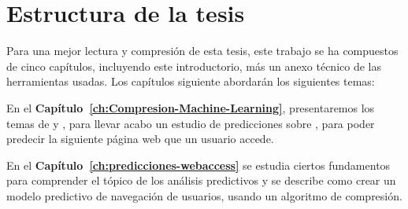 %
%
\section{Estructura de la tesis} 




Para una mejor lectura y compresión de esta tesis, este trabajo se ha compuestos de cinco capítulos, incluyendo este introductorio, más un anexo técnico de las herramientas usadas. Los capítulos siguiente abordarán los siguientes temas:


En el \textbf{Capítulo~\ref{ch:Compresion-Machine-Learning}}, presentaremos los temas de \machinelearning y \losslessdatacompression, para llevar acabo un estudio de predicciones sobre \webasccesslog, para poder predecir la siguiente página web que un usuario accede.



En el \textbf{Capítulo~\ref{ch:predicciones-webaccess}} se estudia ciertos fundamentos para comprender el tópico de los análisis predictivos y se describe como crear un modelo predictivo de navegación de usuarios, usando un algoritmo de compresión.





